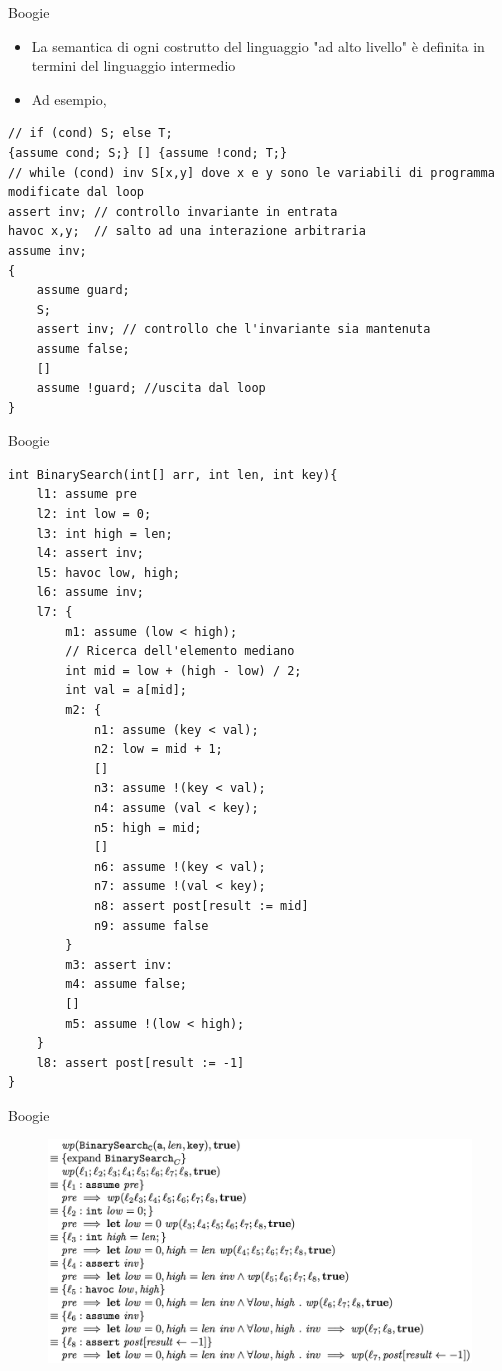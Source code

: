 \documentclass[]{beamer}
\begin{document}
\begin{frame}[containsverbatim]{Boogie}
\begin{itemize}
    \item La semantica di ogni costrutto del linguaggio "ad alto livello" è definita in termini del linguaggio intermedio
    \item Ad esempio,
\end{itemize}
\lstset{linewidth=11cm}   
\begin{lstlisting}
// if (cond) S; else T;
{assume cond; S;} [] {assume !cond; T;}
// while (cond) inv S[x,y] dove x e y sono le variabili di programma modificate dal loop
assert inv; // controllo invariante in entrata
havoc x,y;  // salto ad una interazione arbitraria
assume inv;
{
    assume guard;
    S;
    assert inv; // controllo che l'invariante sia mantenuta
    assume false;
    []
    assume !guard; //uscita dal loop
}
\end{lstlisting}
\end{frame}

\begin{frame}[containsverbatim]{Boogie}
\lstset{linewidth=11cm}   
\begin{lstlisting}[basicstyle=\tiny]
int BinarySearch(int[] arr, int len, int key){
    l1: assume pre
    l2: int low = 0;
    l3: int high = len;
    l4: assert inv;
    l5: havoc low, high;
    l6: assume inv;
    l7: {
        m1: assume (low < high);
        // Ricerca dell'elemento mediano
        int mid = low + (high - low) / 2;
        int val = a[mid];
        m2: {
            n1: assume (key < val);
            n2: low = mid + 1;
            []
            n3: assume !(key < val);
            n4: assume (val < key);
            n5: high = mid;
            []
            n6: assume !(key < val);
            n7: assume !(val < key);
            n8: assert post[result := mid]
            n9: assume false
        }
        m3: assert inv:
        m4: assume false;
        []
        m5: assume !(low < high);
    }
    l8: assert post[result := -1]
}
\end{lstlisting}
\end{frame}

\begin{frame}{Boogie}
\begin{figure}
    \centering
    \includegraphics[scale=0.4]{assets/img/wp1.png}
\end{figure}
\end{frame}
\end{document}
